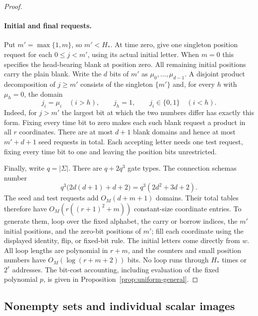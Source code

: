 \documentclass[11pt]{article}
\theoremstyle{definition}
\begin{document}
\begin{proof}
\paragraph{Initial and final requests.}
Put $m'=\max\{1,m\}$, so $m'<H_*$. At time zero, give one singleton
position request for each $0\le j<m'$, using its actual initial letter.
When $m=0$ this specifies the head-bearing blank at position zero.
All remaining initial positions carry the plain blank. Write the
$d$ bits of $m'$ as $\mu_0,\ldots,\mu_{d-1}$. A disjoint product
decomposition of $j\ge m'$ consists of the singleton $\{m'\}$ and,
for every $h$ with $\mu_h=0$, the domain
\begin{equation}\label{eq:computation-blank-domain}
 j_i=\mu_i\quad(i>h),\qquad j_h=1,\qquad
 j_i\in\{0,1\}\quad(i<h).
\end{equation}
Indeed, for $j>m'$ the largest bit at which the two numbers differ has
exactly this form. Fixing every time bit to zero makes each such blank
request a product in all $r$ coordinates. There are at most $d+1$ blank
domains and hence at most $m'+d+1$ seed requests in total. Each accepting
letter needs one test request, fixing every time bit to one and leaving
the position bits unrestricted.

Finally, write $q=|\Sigma|$. There are $q+2q^3$ gate types. The connection
schemas number
\begin{equation}\label{eq:computation-schema-count}
 q^3\bigl(2d(d+1)+d+2\bigr)=q^3(2d^2+3d+2).
\end{equation}
The seed and test requests add $O_M(d+m+1)$ domains. Their total tables
therefore have $O_M(r((r+1)^2+m))$ constant-size coordinate entries.
To generate them, loop over the fixed alphabet, the carry or borrow
indices, the $m'$ initial positions, and the zero-bit positions of $m'$;
fill each coordinate using the displayed identity, flip, or fixed-bit
rule. The initial letters come directly from $w$. All loop lengths are
polynomial in $r+m$, and the counters and small position numbers have
$O_M(\log(r+m+2))$ bits. No loop runs through $H_*$ times or $2^r$
addresses. The bit-cost accounting, including evaluation of the fixed
polynomial $p$, is given in Proposition~\ref{prop:uniform-general}.
\end{proof}

\subsection{Nonempty sets and individual scalar images}\label{sec:consistency}
\end{document}
